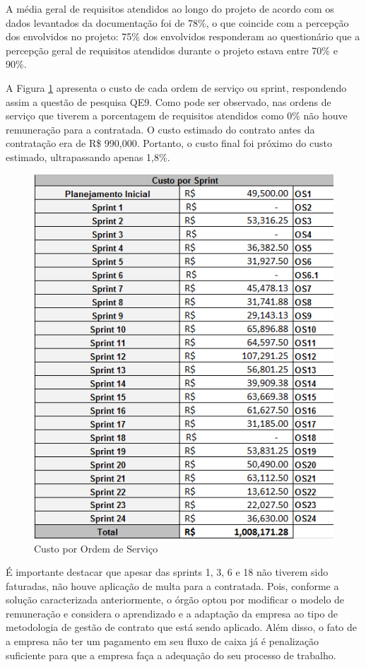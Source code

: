  A média geral de requisitos atendidos ao longo do projeto de acordo com os dados levantados da documentação foi de 78\%, o que coincide com a percepção dos envolvidos no projeto: 75\% dos envolvidos responderam ao questionário que a percepção geral de requisitos atendidos durante o projeto estava entre 70\% e 90\%.

A Figura \ref{custo} apresenta o custo de cada ordem de serviço ou sprint, respondendo assim a questão de pesquisa QE9. Como pode ser observado, nas ordens de serviço que tiverem a porcentagem de requisitos atendidos como 0\% não houve remuneração para a contratada. O custo estimado do contrato antes da contratação era de R\$ 990,000. Portanto, o custo final foi próximo do custo estimado, ultrapassando apenas 1,8\%.

\begin{figure}[H]
		\centering
			\includegraphics[scale=1.0]{figuras/custo.png}
		\caption{Custo por Ordem de Serviço}
		\label{custo}
\end{figure}

É importante destacar que apesar das sprints 1, 3, 6 e 18 não tiverem sido faturadas, não houve aplicação de multa para a contratada. Pois, conforme a solução caracterizada anteriormente, o órgão optou por modificar o modelo de remuneração e considera o aprendizado e a adaptação da empresa ao tipo de metodologia de gestão de contrato que está sendo aplicado. Além disso, o fato de a empresa não ter um pagamento em seu fluxo de caixa já é penalização suficiente para que a empresa faça a adequação do seu processo de trabalho.

